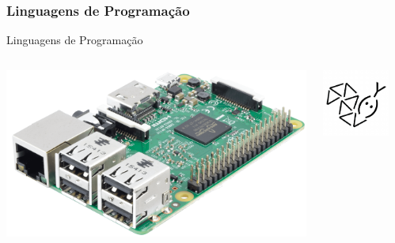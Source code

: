 \documentclass{beamer}
\begin{document}
\subsubsection{Linguagens de Programação }

\begin{frame}{Linguagens de Programação}


\begin{columns}
\begin{column}{0.3\textwidth}
\begin{center}
\includegraphics[width=.8\textwidth]{img/slide_rasp1.png}   
\end{center}
\end{column}
\begin{column}{0.3\textwidth}
\begin{center}
\includegraphics[width=.8\textwidth]{img/pythonanywhere_.png}    
\end{center}
\end{column}
\begin{column}{0.4\textwidth}

\end{column}
\end{columns}
\end{frame}
\end{document}
